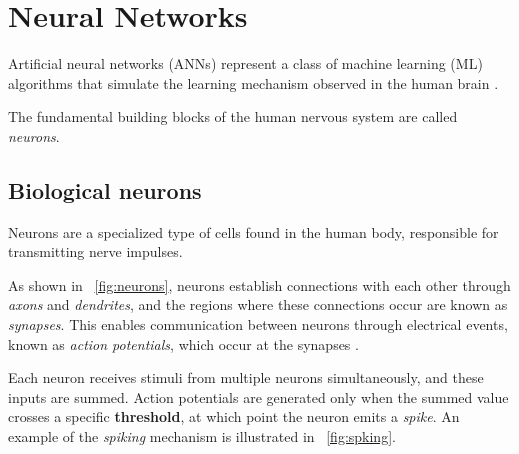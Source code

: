 \section{Neural Networks}
Artificial neural networks (ANNs) represent a class of machine learning (ML) algorithms that simulate the learning mechanism observed in the human brain \cite{aggarwal2018neural}. 

The fundamental building blocks of the human nervous system are called \textit{neurons}. 

\subsection{Biological neurons}

Neurons are a specialized type of cells found in the human body, responsible for transmitting nerve impulses.

As shown in \Fig~\ref{fig:neurons}, neurons establish connections with each other through \textit{axons} and \textit{dendrites}, and the regions where these connections occur are known as \textit{synapses}. This enables communication between neurons through electrical events, known as \textit{action potentials}, which occur at the synapses \cite{APS}. 

Each neuron receives stimuli from multiple neurons simultaneously, and these inputs are summed. Action potentials are generated only when the summed value crosses a specific \textbf{threshold}, at which point the neuron emits a \textit{spike}. An example of the \textit{spiking} mechanism is illustrated in \Fig~\ref{fig:spking}.

